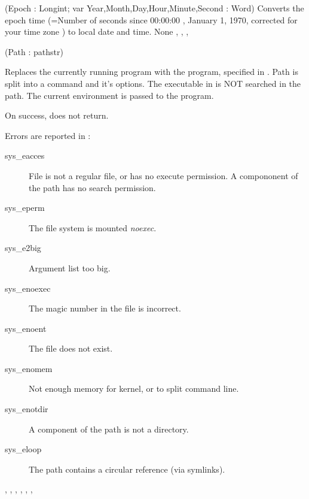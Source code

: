 

{(Epoch : Longint; var Year,Month,Day,Hour,Minute,Second : Word)}
{
Converts the epoch time (=Number of seconds since 00:00:00 , January 1,
1970, corrected for your time zone ) to local date and time.
}
{None}
{, , , }



{(Path : pathstr)}
{
Replaces the currently running program with the program, specified in
. Path is split into a command and it's options.
The executable in  is NOT searched in the path.
The current environment is passed to the program.

On success,  does not return.
}
{Errors are reported in :
\begin{description}
\item[sys\_eacces] File is not a regular file, or has no execute permission.
A compononent of the path has no search permission.
\item[sys\_eperm] The file system is mounted \textit{noexec}.
\item[sys\_e2big] Argument list too big.
\item[sys\_enoexec] The magic number in the file is incorrect.
\item[sys\_enoent] The file does not exist.
\item[sys\_enomem] Not enough memory for kernel, or to split command line.
\item[sys\_enotdir] A component of the path is not a directory.
\item[sys\_eloop] The path contains a circular reference (via symlinks).
\end{description}}
{, , , ,
 , ,  }



